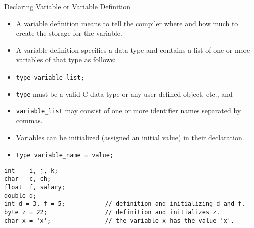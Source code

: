 \documentclass[10pt,t]{beamer}
\begin{document}
\begin{frame}[fragile]{Declaring Variable or Variable Definition}
  \begin{itemize}
    \item A variable definition means to tell the compiler where and how much to create the storage for the variable. 
    \item A variable definition specifies a data type and contains a list of one or more variables of that type as follows:
    \item[] \lstinline{type variable_list;}
    \item \lstinline{type} must be a valid C data type or any user-defined object, etc., and 
    \item[] \lstinline{variable_list} may consist of one or more identifier names separated by commas.
    \item Variables can be initialized (assigned an initial value) in their declaration.
    \item[] \lstinline{type variable_name = value;}
  \end{itemize}
  \begin{lstlisting}
int    i, j, k;
char   c, ch;
float  f, salary;
double d;
int d = 3, f = 5;           // definition and initializing d and f. 
byte z = 22;                // definition and initializes z. 
char x = 'x';               // the variable x has the value 'x'.
  \end{lstlisting}
\end{frame}
\end{document}
